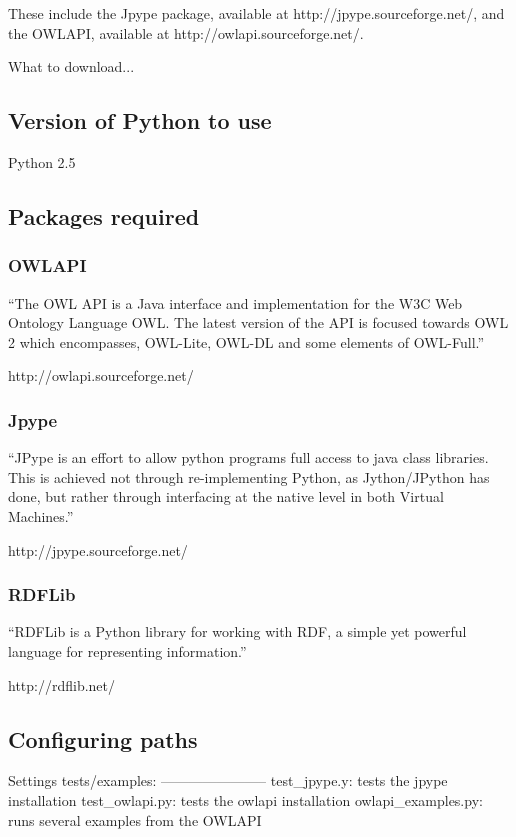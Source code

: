 \documentclass[]{article}
\begin{document}
These include the Jpype package, available at http://jpype.sourceforge.net/, and the OWLAPI, available at http://owlapi.sourceforge.net/. 

What to download...



\subsection{Version of Python to use}
Python 2.5 

\subsection{Packages required}

\subsubsection{OWLAPI}
``The OWL API is a Java interface and implementation for the W3C Web Ontology Language OWL. The latest version of the API is focused towards OWL 2 which encompasses, OWL-Lite, OWL-DL and some elements of OWL-Full.''

http://owlapi.sourceforge.net/


\subsubsection{Jpype}

``JPype is an effort to allow python programs full access to java class libraries. This is achieved not through re-implementing Python, as Jython/JPython has done, but rather through interfacing at the native level in both Virtual Machines.''

http://jpype.sourceforge.net/

\subsubsection{RDFLib}
``RDFLib is a Python library for working with RDF, a simple yet powerful language for representing information.''

http://rdflib.net/



\subsection{Configuring paths}

Settings tests/examples:
-----------------------
test\_jpype.y: tests the jpype installation
test\_owlapi.py: tests the owlapi installation
owlapi\_examples.py: runs several examples from the OWLAPI
\end{document}
